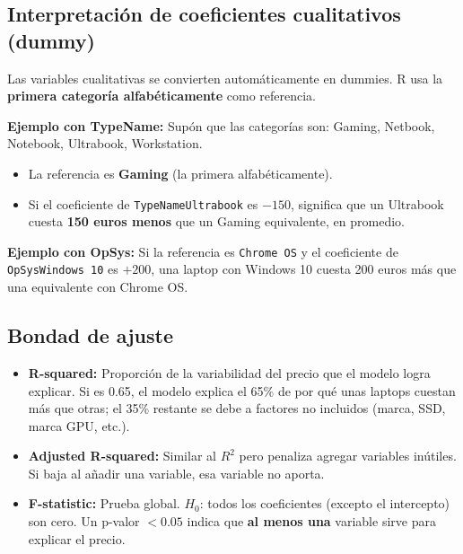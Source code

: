 \documentclass[12pt,a4paper]{article}
\begin{document}
\subsection{Interpretación de coeficientes cualitativos (dummy)}

Las variables cualitativas se convierten automáticamente en dummies. R usa la \textbf{primera categoría alfabéticamente} como referencia.

\textbf{Ejemplo con TypeName:}
Supón que las categorías son: Gaming, Netbook, Notebook, Ultrabook, Workstation.
\begin{itemize}
    \item La referencia es \textbf{Gaming} (la primera alfabéticamente).
    \item Si el coeficiente de \texttt{TypeNameUltrabook} es $-150$, significa que un Ultrabook cuesta \textbf{150 euros menos} que un Gaming equivalente, en promedio.
\end{itemize}

\textbf{Ejemplo con OpSys:}
Si la referencia es \texttt{Chrome OS} y el coeficiente de \texttt{OpSysWindows 10} es $+200$, una laptop con Windows 10 cuesta 200 euros más que una equivalente con Chrome OS.

\subsection{Bondad de ajuste}

\begin{itemize}
    \item \textbf{R-squared:} Proporción de la variabilidad del precio que el modelo logra explicar. Si es 0.65, el modelo explica el 65\% de por qué unas laptops cuestan más que otras; el 35\% restante se debe a factores no incluidos (marca, SSD, marca GPU, etc.).
    
    \item \textbf{Adjusted R-squared:} Similar al $R^2$ pero penaliza agregar variables inútiles. Si baja al añadir una variable, esa variable no aporta.
    
    \item \textbf{F-statistic:} Prueba global. $H_0$: todos los coeficientes (excepto el intercepto) son cero. Un p-valor $< 0.05$ indica que \textbf{al menos una} variable sirve para explicar el precio.
\end{itemize}

\end{document}
